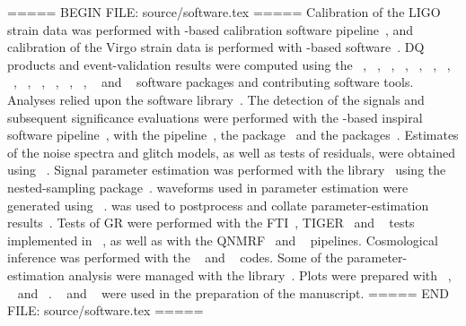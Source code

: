 ===== BEGIN FILE: source/software.tex =====
Calibration of the \ac{LIGO} strain data was performed with \GSTLAL{}-based calibration software pipeline~\cite{Viets:2017yvy}, and calibration of the Virgo strain data is performed with -based software~\citep{VIRGO:2021umk}.
\Ac{DQ} products and event-validation results were computed using the \BRISTOL{}~\cite{DiRenzo:2024neb}, \DMT{}~\cite{DMTdocumentation}, \DQR{}~\cite{DQRdocumentation}, \DQSEGDB{}~\cite{Fisher:2020pnr}, \GLITCHFIND~\cite{Vazsonyi:2022jul}, \GSPYNETTREE{}~\cite{Alvarez-Lopez:2023dmv}, \GWDETCHAR{}~\cite{gwdetchar-software}, \HVETO{}~\cite{Smith:2011an}, \IDQ{}~\cite{Essick:2020qpo}, \LDVW{}~\cite{Areeda:2016mee}, \OMEGAOVERLAP{}~\cite{Macas:2023zdu}, \OMICRON{}~\cite{Robinet:2020lbf}, \PEMCHECK{}~\cite{Helmling-Cornell:2023wqe}, \PVIRGOTOOLS{}~\cite{pythonvirgotools} and \STATIONARITY{}~\cite{Mozzon:2020gwa} software packages and contributing software tools.
Analyses relied upon the \LALSUITE{} software library~\cite{lalsuite-software,Wette:2020air}.
The detection of the signals and subsequent significance evaluations were performed with the \GSTLAL{}-based inspiral software pipeline~\cite{Messick:2016aqy,Sachdev:2019vvd,Hanna:2019ezx,Cannon:2020qnf}, with the \MBTA{} pipeline~\cite{Adams:2015ulm,Aubin:2020goo}, the \PYCBC{} package~\cite{Usman:2015kfa,Nitz:2017svb,Davies:2020tsx} and the \CWB{} packages~\cite{Klimenko:2004qh,Klimenko:2011hz,Klimenko:2015ypf,Drago:2020kic,Mishra:2024zzs}.
Estimates of the noise spectra and glitch models, as well as tests of residuals, were obtained using \BAYESWAVE{}~\cite{Cornish:2014kda,Littenberg:2015kpb,Cornish:2020dwh}.
Signal parameter estimation was performed with the \BILBY{} library~\cite{Ashton:2018jfp,Romero-Shaw:2020owr} using the \DYNESTY{} nested-sampling package~\cite{Speagle:2019ivv}.
\SEOBNRFIVEPHM waveforms used in parameter estimation were generated using \PYSEOBNR{}~\cite{Mihaylov:2023bkc}.
\PESUMMARY{} was used to postprocess and collate parameter-estimation results~\cite{Hoy:2020vys}.
Tests of \ac{GR} were performed with the \ac{FTI}~\cite{Mehta:2022pcn}, \ac{TIGER}~\cite{Agathos:2013upa,Meidam:2017dgf,Roy:2025gzv} and \PSEOBNR{}~\cite{Brito:2018rfr,Ghosh:2021mrv,Maggio:2022hre,Toubiana:2023cwr,Pompili:2025cdc} tests implemented in \BILBYTGR{}~\cite{bibly-tgr-software}, as well as with the \ac{QNMRF}~\cite{Ma:2022wpv,Ma:2023vvr,Ma:2023cwe,Lu:2025mwp} and \RINGDOWN{}~\cite{Isi:2019aib,Isi:2021iql,Siegel:2024jqd} pipelines.
Cosmological inference was performed with the \GWCOSMO{}~\cite{Gray:2019ksv,Gray:2021sew,Gray:2023wgj} and \ICAROGW{}~\cite{Mastrogiovanni:2023emh,Mastrogiovanni:2023zbw} codes.
Some of the parameter-estimation analysis were managed with the \ASIMOV{} library~\cite{Williams:2022pgn}.
Plots were prepared with \MATPLOTLIB{}~\cite{Hunter:2007ouj}, \SEABORN{}~\cite{Waskom:2021psk} and \GWPY{}~\cite{gwpy-software}.
\NUMPY{}~\cite{Harris:2020xlr} and \SCIPY{}~\cite{Virtanen:2019joe} were used
in the preparation of the manuscript.
===== END FILE: source/software.tex =====

